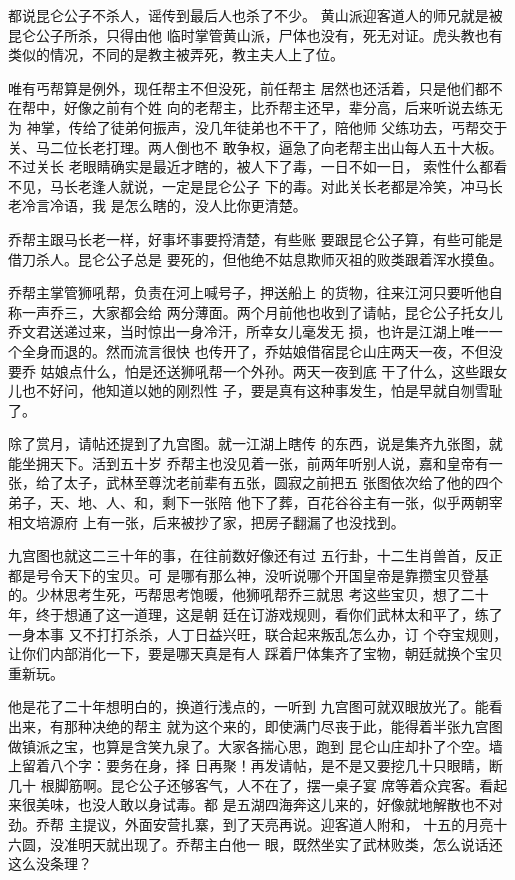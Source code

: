 都说昆仑公子不杀人，谣传到最后人也杀了不少。
黄山派迎客道人的师兄就是被昆仑公子所杀，只得由他
临时掌管黄山派，尸体也没有，死无对证。虎头教也有
类似的情况，不同的是教主被弄死，教主夫人上了位。

唯有丐帮算是例外，现任帮主不但没死，前任帮主
居然也还活着，只是他们都不在帮中，好像之前有个姓
向的老帮主，比乔帮主还早，辈分高，后来听说去练无为
神掌，传给了徒弟何振声，没几年徒弟也不干了，陪他师
父练功去，丐帮交于关、马二位长老打理。两人倒也不
敢争权，逼急了向老帮主出山每人五十大板。不过关长
老眼睛确实是最近才瞎的，被人下了毒，一日不如一日，
索性什么都看不见，马长老逢人就说，一定是昆仑公子
下的毒。对此关长老都是冷笑，冲马长老冷言冷语，我
是怎么瞎的，没人比你更清楚。

乔帮主跟马长老一样，好事坏事要捋清楚，有些账
要跟昆仑公子算，有些可能是借刀杀人。昆仑公子总是
要死的，但他绝不姑息欺师灭祖的败类跟着浑水摸鱼。

乔帮主掌管狮吼帮，负责在河上喊号子，押送船上
的货物，往来江河只要听他自称一声乔三，大家都会给
两分薄面。两个月前他也收到了请帖，昆仑公子托女儿
乔文君送递过来，当时惊出一身冷汗，所幸女儿毫发无
损，也许是江湖上唯一一个全身而退的。然而流言很快
也传开了，乔姑娘借宿昆仑山庄两天一夜，不但没要乔
姑娘点什么，怕是还送狮吼帮一个外孙。两天一夜到底
干了什么，这些跟女儿也不好问，他知道以她的刚烈性
子，要是真有这种事发生，怕是早就自刎雪耻了。

除了赏月，请帖还提到了九宫图。就一江湖上瞎传
的东西，说是集齐九张图，就能坐拥天下。活到五十岁
乔帮主也没见着一张，前两年听别人说，嘉和皇帝有一
张，给了太子，武林至尊沈老前辈有五张，圆寂之前把五
张图依次给了他的四个弟子，天、地、人、和，剩下一张陪
他下了葬，百花谷谷主有一张，似乎两朝宰相文培源府
上有一张，后来被抄了家，把房子翻漏了也没找到。

九宫图也就这二三十年的事，在往前数好像还有过
五行卦，十二生肖兽首，反正都是号令天下的宝贝。可
是哪有那么神，没听说哪个开国皇帝是靠攒宝贝登基
的。少林思考生死，丐帮思考饱暖，他狮吼帮乔三就思
考这些宝贝，想了二十年，终于想通了这一道理，这是朝
廷在订游戏规则，看你们武林太和平了，练了一身本事
又不打打杀杀，人丁日益兴旺，联合起来叛乱怎么办，订
个夺宝规则，让你们内部消化一下，要是哪天真是有人
踩着尸体集齐了宝物，朝廷就换个宝贝重新玩。

他是花了二十年想明白的，换道行浅点的，一听到
九宫图可就双眼放光了。能看出来，有那种决绝的帮主
就为这个来的，即使满门尽丧于此，能得着半张九宫图
做镇派之宝，也算是含笑九泉了。大家各揣心思，跑到
昆仑山庄却扑了个空。墙上留着八个字：要务在身，择
日再聚！再发请帖，是不是又要挖几十只眼睛，断几十
根脚筋啊。昆仑公子还够客气，人不在了，摆一桌子宴
席等着众宾客。看起来很美味，也没人敢以身试毒。都
是五湖四海奔这儿来的，好像就地解散也不对劲。乔帮
主提议，外面安营扎寨，到了天亮再说。迎客道人附和，
十五的月亮十六圆，没准明天就出现了。乔帮主白他一
眼，既然坐实了武林败类，怎么说话还这么没条理？

